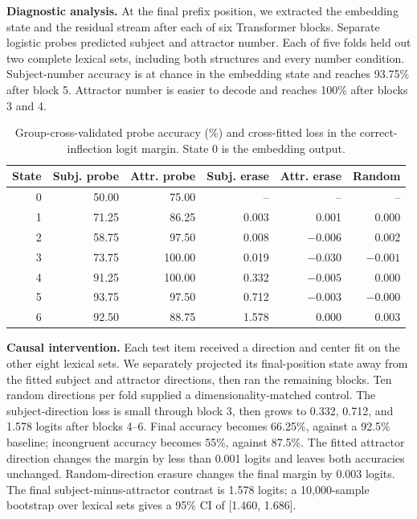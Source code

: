 \documentclass[12pt]{article}
\begin{document}
\textbf{Diagnostic analysis.}
At the final prefix position, we extracted the embedding state and the residual
stream after each of six Transformer blocks. Separate logistic probes predicted
subject and attractor number. Each of five folds held out two complete lexical
sets, including both structures and every number condition. Subject-number
accuracy is at chance in the embedding state and reaches 93.75\% after block 5.
Attractor number is easier to decode and reaches 100\% after blocks 3 and 4.

\begin{table}[h]
\centering
\caption{Group-cross-validated probe accuracy (\%) and cross-fitted loss in
the correct-inflection logit margin. State 0 is the embedding output.}
\vspace{-0.35em}
\begin{tabular}{@{}rrrrrr@{}}
\toprule
State & Subj. probe & Attr. probe & Subj. erase & Attr. erase & Random\\
\midrule
0 & 50.00 & 75.00 & -- & -- & --\\
1 & 71.25 & 86.25 & 0.003 & 0.001 & 0.000\\
2 & 58.75 & 97.50 & 0.008 & $-0.006$ & 0.002\\
3 & 73.75 & 100.00 & 0.019 & $-0.030$ & $-0.001$\\
4 & 91.25 & 100.00 & 0.332 & $-0.005$ & 0.000\\
5 & 93.75 & 97.50 & 0.712 & $-0.003$ & $-0.000$\\
6 & 92.50 & 88.75 & 1.578 & 0.000 & 0.003\\
\bottomrule
\end{tabular}
\end{table}
\vspace{-0.55em}

\textbf{Causal intervention.}
Each test item received a direction and center fit on the other eight lexical
sets. We separately projected its final-position state away from the fitted
subject and attractor directions, then ran the remaining blocks. Ten random
directions per fold supplied a dimensionality-matched control. The
subject-direction loss is small through block 3, then grows to 0.332, 0.712,
and 1.578 logits after blocks 4--6. Final accuracy becomes 66.25\%, against a
92.5\% baseline; incongruent accuracy becomes 55\%, against 87.5\%. The fitted attractor
direction changes the margin by less than 0.001 logits and leaves both
accuracies unchanged. Random-direction erasure changes the final margin by
0.003 logits. The final subject-minus-attractor contrast is 1.578 logits; a
10,000-sample bootstrap over lexical sets gives a 95\% CI of [1.460, 1.686].
\end{document}
